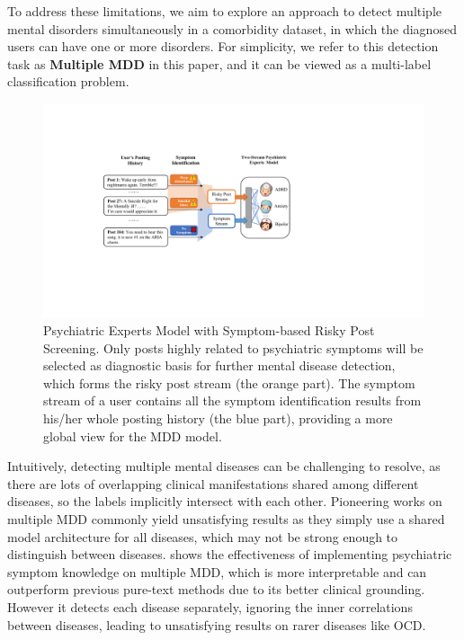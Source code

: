 To address these limitations, we aim to explore an approach to detect multiple mental disorders simultaneously in a comorbidity dataset, in which the diagnosed users can have one or more disorders. For simplicity, we refer to this detection task as \textbf{Multiple MDD} in this paper, and it can be viewed as a multi-label classification problem.
\begin{figure}[t]
    \centering
    \includegraphics[width=1.7\columnwidth]{figures/pipeline.pdf}
    \caption{Psychiatric Experts Model with Symptom-based Risky Post Screening. Only posts highly related to psychiatric symptoms will be selected as diagnostic basis for further mental disease detection, which forms the risky post stream (the orange part). The symptom stream of a user contains all the symptom identification results from his/her whole posting history (the blue part), providing a more global view for the MDD model.}
    \label{fig:pipeline}
\end{figure}

Intuitively, detecting multiple mental diseases can be challenging to resolve, as there are lots of overlapping clinical manifestations shared among different diseases, so the labels implicitly intersect with each other. Pioneering works on multiple MDD \cite{cohan2018smhd, sekulic2019adapting} commonly yield unsatisfying results as they simply use a shared model architecture for all diseases, which may not be strong enough to distinguish between diseases. \citet{Zhang2022SymptomIF} shows the effectiveness of implementing psychiatric symptom knowledge on multiple MDD, which is more interpretable and can outperform previous pure-text methods due to its better clinical grounding. However it detects each disease separately, ignoring the inner correlations between diseases, leading to unsatisfying results on rarer diseases like OCD.

